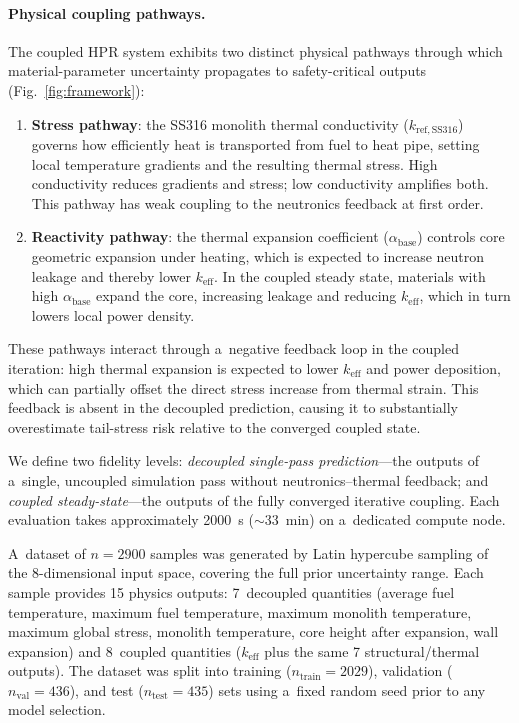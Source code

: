 \documentclass[pdflatex,sn-mathphys-num]{sn-jnl}
\theoremstyle{thmstyleone}
\theoremstyle{thmstyletwo}
\theoremstyle{thmstylethree}
\begin{document}
\paragraph{Physical coupling pathways.}
The coupled HPR system exhibits two distinct physical pathways through which
material-parameter uncertainty propagates to safety-critical outputs
(Fig.~\ref{fig:framework}):
\begin{enumerate}[label=(\roman*)]
  \item \textbf{Stress pathway}: the SS316 monolith thermal conductivity
    ($k_{\mathrm{ref,SS316}}$) governs how efficiently heat is transported
    from fuel to heat pipe, setting local temperature gradients and the
    resulting thermal stress.
    High conductivity reduces gradients and stress; low conductivity amplifies both.
    This pathway has weak coupling to the neutronics feedback at first order.

  \item \textbf{Reactivity pathway}: the thermal expansion coefficient
    ($\alpha_{\mathrm{base}}$) controls core geometric expansion under heating,
    which is expected to increase neutron leakage and thereby lower
    $k_{\mathrm{eff}}$.
    In the coupled steady state, materials with high $\alpha_{\mathrm{base}}$
    expand the core, increasing leakage and reducing $k_{\mathrm{eff}}$,
    which in turn lowers local power density.
\end{enumerate}
These pathways interact through a~negative feedback loop in the coupled iteration:
high thermal expansion is expected to lower $k_{\mathrm{eff}}$ and power
deposition, which can partially offset the direct stress increase from thermal
strain.
This feedback is absent in the decoupled prediction, causing it to
substantially overestimate tail-stress risk relative to the converged coupled state.

We define two fidelity levels:
\textit{decoupled single-pass prediction}---the outputs of a~single, uncoupled
simulation pass without neutronics--thermal feedback; and
\textit{coupled steady-state}---the outputs of the fully converged iterative coupling.
Each evaluation takes approximately \SI{2000}{s} (${\sim}33$~min) on a~dedicated compute node.

A~dataset of $n=\num{2900}$ samples was generated by Latin hypercube sampling of
the 8-dimensional input space, covering the full prior uncertainty range.
Each sample provides 15 physics outputs: 7~decoupled quantities
(average fuel temperature, maximum fuel temperature, maximum monolith temperature,
maximum global stress, monolith temperature, core height after expansion, wall
expansion) and 8~coupled quantities ($k_{\mathrm{eff}}$ plus the same 7 structural/thermal
outputs).
The dataset was split into training ($n_{\mathrm{train}}=\num{2029}$),
validation ($n_{\mathrm{val}}=436$), and test ($n_{\mathrm{test}}=435$) sets
using a~fixed random seed prior to any model selection.
\end{document}
